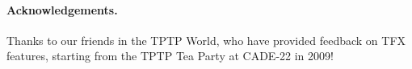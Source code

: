 \documentclass{easychair}
\begin{document}
\paragraph{Acknowledgements.}
Thanks to our friends in the TPTP World, who have provided feedback on TFX
features, starting from the TPTP Tea Party at CADE-22 in 2009!



\end{document}
